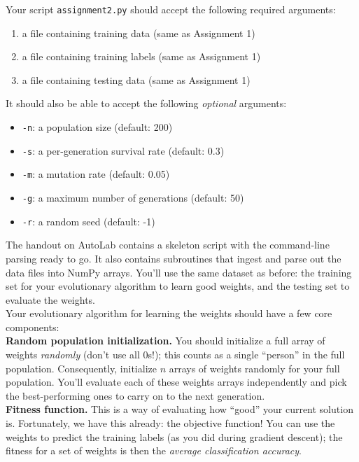 \documentclass[paper=a4, fontsize=11pt]{scrartcl} %
\numberwithin{figure}{section} %
\numberwithin{table}{section} %
\begin{document}
Your script \texttt{assignment2.py} should accept the following required arguments:

\begin{enumerate}
	\item a file containing training data (same as Assignment 1)
	\item a file containing training labels (same as Assignment 1)
	\item a file containing testing data (same as Assignment 1)
\end{enumerate}

It should also be able to accept the following \emph{optional} arguments:

\begin{itemize}
	\item \texttt{-n}: a population size (default: 200)
	\item \texttt{-s}: a per-generation survival rate (default: 0.3)
	\item \texttt{-m}: a mutation rate (default: 0.05)
	\item \texttt{-g}: a maximum number of generations (default: 50)
	\item \texttt{-r}: a random seed (default: -1)
\end{itemize}

The handout on AutoLab contains a skeleton script with the command-line parsing ready to go. It also contains subroutines that ingest and parse out the data files into NumPy arrays. You'll use the same dataset as before: the training set for your evolutionary algorithm to learn good weights, and the testing set to evaluate the weights. \\

Your evolutionary algorithm for learning the weights should have a few core components: \\

\textbf{Random population initialization.} You should initialize a full array of weights \emph{randomly} (don't use all 0s!); this counts as a single ``person'' in the full population. Consequently, initialize $n$ arrays of weights randomly for your full population. You'll evaluate each of these weights arrays independently and pick the best-performing ones to carry on to the next generation. \\

\textbf{Fitness function.} This is a way of evaluating how ``good'' your current solution is. Fortunately, we have this already: the objective function! You can use the weights to predict the training labels (as you did during gradient descent); the fitness for a set of weights is then the \emph{average classification accuracy}. \\
\end{document}
